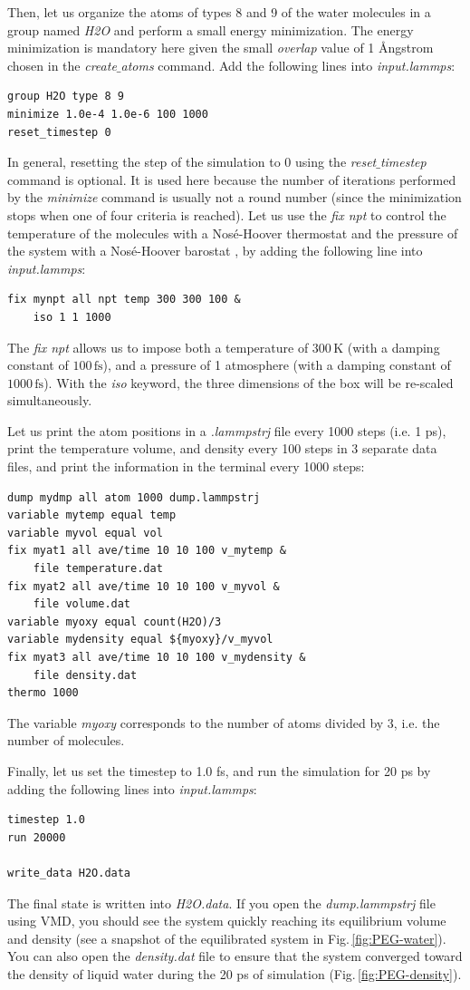 \documentclass[9pt,tutorial]{livecoms}
\begin{document}
Then, let us organize the atoms of types 8 and 9 of the water molecules in a group named \textit{H2O} and perform a small energy minimization. The energy minimization is mandatory here given the small \textit{overlap} value of 1 Ångstrom chosen in the \textit{create$\_$atoms} command. Add the following lines into \textit{input.lammps}:
{\normalsize \begin{verbatim}
group H2O type 8 9
minimize 1.0e-4 1.0e-6 100 1000
reset_timestep 0
\end{verbatim}}
In general, resetting the step of the simulation to 0 using the \textit{reset$\_$timestep} command is optional.
It is used here because the number of iterations performed by the \textit{minimize} command is usually not a round number (since the minimization stops when one of four criteria is reached). Let us use the \textit{fix npt} to control the temperature of the molecules with a Nosé-Hoover thermostat and the pressure of the system with a Nosé-Hoover barostat \cite{nose1984unified, hoover1985canonical, martyna1994constant}, by adding the following line into \textit{input.lammps}:
{\normalsize \begin{verbatim}
fix mynpt all npt temp 300 300 100 &
    iso 1 1 1000
\end{verbatim}}
The \textit{fix npt} allows us to impose both a temperature of $300\,\text{K}$ (with a damping constant of $100\,\text{fs}$),
and a pressure of 1 atmosphere (with a damping constant of $1000\,\text{fs}$). With the \textit{iso} keyword, the three dimensions of the box will be re-scaled simultaneously.

Let us print the atom positions in a \textit{.lammpstrj} file every 1000 steps (i.e. 1 ps), print the temperature volume, and density every 100 steps in 3 separate data files, and print the information in the terminal every 1000 steps:
{\normalsize \begin{verbatim}
dump mydmp all atom 1000 dump.lammpstrj
variable mytemp equal temp
variable myvol equal vol
fix myat1 all ave/time 10 10 100 v_mytemp &
    file temperature.dat
fix myat2 all ave/time 10 10 100 v_myvol &
    file volume.dat
variable myoxy equal count(H2O)/3
variable mydensity equal ${myoxy}/v_myvol
fix myat3 all ave/time 10 10 100 v_mydensity &
    file density.dat
thermo 1000
\end{verbatim}}
The variable \textit{myoxy} corresponds to the number of atoms divided by 3, i.e. the number of molecules.

Finally, let us set the timestep to 1.0 fs, and run the simulation for 20 ps by adding the
following lines into \textit{input.lammps}:
{\normalsize \begin{verbatim}
timestep 1.0
run 20000

write_data H2O.data
\end{verbatim}}
The final state is written into \textit{H2O.data}. If you open the \textit{dump.lammpstrj} file using VMD, you should
see the system quickly reaching its equilibrium volume and density (see a snapshot of the equilibrated system in Fig.\,\ref{fig:PEG-water}). You can also open the \textit{density.dat} file to ensure that the system converged toward the density of liquid water during the 20 ps of simulation (Fig.\,\ref{fig:PEG-density}).
\end{document}
